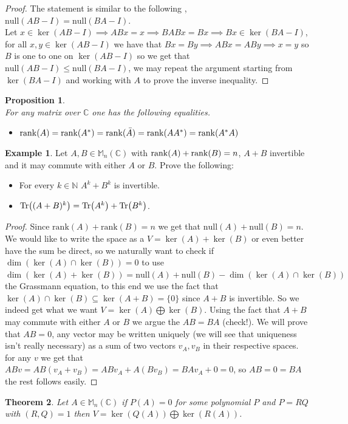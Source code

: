 \documentclass[12pt]{article}
\newcommand{\Rank}{\mathrm{rank}}
\newcommand{\Null}{\mathrm{null}}
\newtheorem{theorem}{Theorem}[section]
\newtheorem{prop}[theorem]{Proposition}
\theoremstyle{definition}
\newtheorem*{example}{Example}
\theoremstyle{remark}
\theoremstyle{plain}
\begin{document}
\begin{proof}
    The statement is similar to the following , $\Null(AB-I)=\Null(BA-I)$.
    \\Let $x\in \ker(AB-I) \implies ABx=x \implies BABx=Bx \implies Bx\in \ker(BA-I)$, for all $x,y \in \ker(AB-I)$ we have that $ Bx=By \implies ABx=ABy \implies x=y$ so $B$ is one to one on $\ker(AB-I)$ so we get that $\Null(AB-I)\leq \Null(BA-I)$, we may repeat the argument starting from $\ker(BA-I)$ and working with $A$ to prove the inverse inequality.
\end{proof}
\begin{prop}\leavevmode \\
    For any matrix over $\mathbb{C}$ one has the following equalities.
    \begin{itemize}
        \item $\rank(A)=\rank(A^*)=\rank(\bar{A})=\rank(AA^*)=\rank(A^*A)$
    \end{itemize}
\end{prop}

\begin{example}
    Let $A,B\in \mathbb{M}_n(\mathbb{C})$ with $\rank(A)+\rank(B)=n$, $A+B$ invertible and it may commute with either $A$ or $B$. Prove the following:
    \begin{itemize}
        \item For every $k\in \mathbb{N}$ $A^k+B^k$ is invertible.
        \item $\Tr((A+B)^k)=\Tr(A^k)+\Tr(B^k)$.
    \end{itemize}
    \begin{proof}
        Since $\Rank(A)+\Rank(B)=n$ we get that $\Null(A)+\Null(B)=n$. We would like to write the space as a $V=\ker(A)+\ker(B)$ or even better have the sum be direct, so we naturally want to check if $\dim(\ker(A)\cap \ker(B))=0$ to use $\dim(\ker(A)+\ker(B))=\Null(A)+\Null(B)-\dim(\ker(A)\cap \ker(B))$ the Grassmann equation, to this end we use the fact that $\ker(A)\cap \ker(B)\subseteq\ker(A+B)=\{ 0\}$ since $A+B$ is invertible. So we indeed get what we want $V=\ker(A) \bigoplus \ker(B)$. Using the fact that $A+B$ may commute with either $A$ or $B$ we argue the $AB=BA$ (check!). We will prove that $AB=0$,
        any vector may be written uniquely (we will see that uniqueness isn't really necessary) as a sum of two vectors $v_A,v_B$ in their respective spaces.
        for any $v$ we get that $ABv=AB(v_A+v_B)=ABv_A+A(Bv_B)=BAv_A+0=0$, so $AB=0=BA$ the rest follows easily.
    \end{proof}
\end{example}
\begin{theorem}
    Let $A\in \mathbb{M}_n(\mathbb{C})$ if $P(A)=0$ for some polynomial $P$ and $P=RQ$ with $(R,Q)=1$ then $V=\ker(Q(A)) \bigoplus \ker(R(A))$.
\end{theorem}
\newpage
\end{document}
